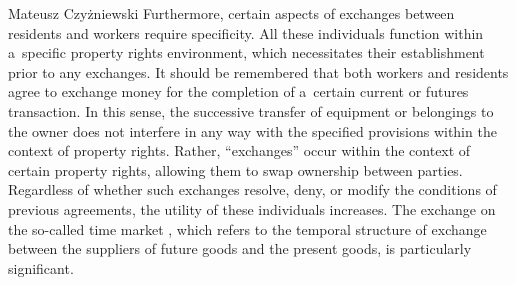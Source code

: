 \begin{newrevengenv}{Mateusz Czyżniewski}
Furthermore, certain aspects of exchanges between residents and workers require specificity. All these individuals function within a~specific property rights environment, which necessitates their establishment prior to any exchanges. It should be remembered that both workers and residents agree to exchange money for the completion of a~certain current or futures transaction. In this sense, the successive transfer of equipment or belongings to the owner does not interfere in any way with the specified provisions within the context of property rights. Rather, ``exchanges'' occur within the context of certain property rights, allowing them to swap ownership between parties. Regardless of whether such exchanges resolve, deny, or modify the conditions of previous agreements, the utility of these individuals increases. The exchange on the so-called time market 
\parencite[][pp.390–410]{rothbard_man_2009}, %
 which refers to the temporal structure of exchange between the suppliers of future goods and the present goods, is particularly significant.




\end{newrevengenv}
